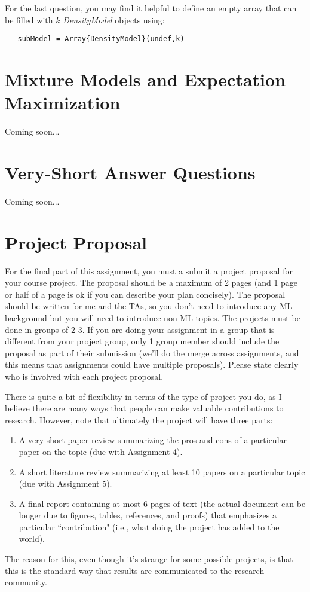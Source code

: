 \documentclass{article}
\def\ans#1{\par\gre{Answer: #1}}
\def\blu#1{{\color{blu}#1}}
\def\gre#1{{\color{gre}#1}}
\def\enum#1{\begin{enumerate}#1\end{enumerate}}
\begin{document}
For the last question, you may find it helpful to define an empty array that can be filled with $k$ \emph{DensityModel} objects  using:
\begin{verbatim}
   subModel = Array{DensityModel}(undef,k)
\end{verbatim}

\def\ans#1{} %

\section{Mixture Models and Expectation Maximization}

Coming soon...


\section{Very-Short Answer Questions}

Coming soon...



\section{Project Proposal}


For the final part of this assignment, you must a \blu{submit a project proposal} for your course project. The proposal should be a maximum of 2 pages (and 1 page or half of a page is ok if you can describe your plan concisely). The proposal should be written for me and the TAs, so you don't need to introduce any ML background but you will need to introduce non-ML topics. The projects must be done in groups of 2-3. If you are doing your assignment in a group that is different from your project group, only  1 group member should include the proposal as part of their submission (we'll do the merge across assignments, and this means that assignments could have multiple proposals). Please state clearly who is involved with each project proposal.

There is quite a bit of flexibility in terms of the type of project you do, as I believe there are many ways that people can make valuable contributions to research. However, note that ultimately the project will have three parts:
\enum{
\item A very short paper review summarizing the pros and cons of a particular paper on the topic (due with Assignment 4).
\item A short literature review summarizing at least 10 papers on a particular topic (due with Assignment 5).
\item A final report containing at most 6 pages of text (the actual document can be longer due to figures, tables, references, and proofs) that emphasizes a particular ``contribution" (i.e., what doing the project has added to the world).
}
The reason for this, even though it's strange for some possible projects, is that this is the standard way that results are communicated to the research community.
\end{document}
